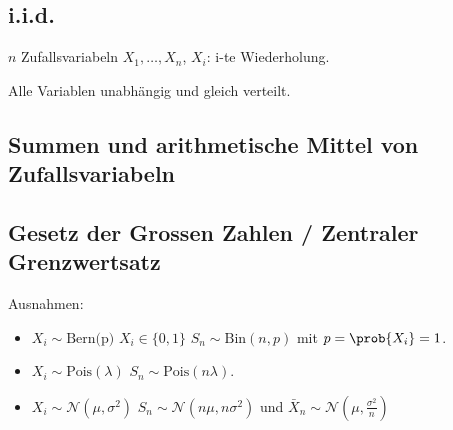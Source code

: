 \documentclass[8pt,a4paper]{scrartcl}
\begin{document}
\begin{multicols*}{3}
\subsection{i.i.d.}

$n$ Zufallsvariabeln $X_1,\ldots,X_n$, $X_i$: i-te Wiederholung.

Alle Variablen unabhängig und gleich verteilt.


\subsection{Summen und arithmetische Mittel von Zufallsvariabeln}




\vfill
\null
\columnbreak

\subsection{Gesetz der Grossen Zahlen / Zentraler Grenzwertsatz}







Ausnahmen:
\begin{itemize}
\item $X_i\sim\text{Bern(p)}$ \dahe $X_i\in\{0,1\}$ \dahe $S_n\sim \text{Bin}(n,p)$ mit $p=\prob{X_i}=1$.
\item $X_i\sim\text{Pois}(\lambda)$ \dahe $S_n\sim \text{Pois}(n\lambda)$.
\item $X_i\sim\mathcal{N}(\mu,\sigma^2)$ \dahe $S_n\sim\mathcal{N}(n\mu,n\sigma^2)$ und $\bar{X}_n\sim\mathcal{N}(\mu,\frac{\sigma^2}{n})$
\end{itemize}


\end{multicols*}
\end{document}
